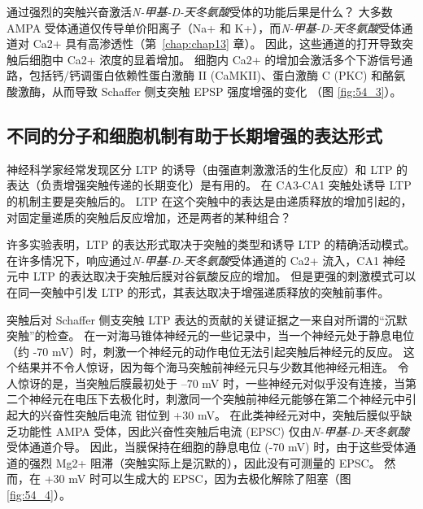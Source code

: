 通过强烈的突触兴奋激活\textit{N-甲基-D-天冬氨酸}受体的功能后果是什么？
大多数 AMPA 受体通道仅传导单价阳离子（Na+ 和 K+），而\textit{N-甲基-D-天冬氨酸}受体通道对 Ca2+ 具有高渗透性（第~\ref{chap:chap13} 章）。
因此，这些通道的打开导致突触后细胞中 Ca2+ 浓度的显着增加。
细胞内 Ca2+ 的增加会激活多个下游信号通路，包括钙/钙调蛋白依赖性蛋白激酶 II (CaMKII)、蛋白激酶 C (PKC) 和酪氨酸激酶，从而导致 Schaffer 侧支突触 EPSP 强度增强的变化 （图 \ref{fig:54_3}）。



\subsection{不同的分子和细胞机制有助于长期增强的表达形式}

神经科学家经常发现区分 LTP 的诱导（由强直刺激激活的生化反应）和 LTP 的表达（负责增强突触传递的长期变化）是有用的。
在 CA3-CA1 突触处诱导 LTP 的机制主要是突触后的。
LTP 在这个突触中的表达是由递质释放的增加引起的，对固定量递质的突触后反应增加，还是两者的某种组合？


许多实验表明，LTP 的表达形式取决于突触的类型和诱导 LTP 的精确活动模式。
在许多情况下，响应通过\textit{N-甲基-D-天冬氨酸}受体通道的 Ca2+ 流入，CA1 神经元中 LTP 的表达取决于突触后膜对谷氨酸反应的增加。
但是更强的刺激模式可以在同一突触中引发 LTP 的形式，其表达取决于增强递质释放的突触前事件。


突触后对 Schaffer 侧支突触 LTP 表达的贡献的关键证据之一来自对所谓的“沉默突触”的检查。
在一对海马锥体神经元的一些记录中，当一个神经元处于静息电位（约 -70 mV）时，刺激一个神经元的动作电位无法引起突触后神经元的反应。
这个结果并不令人惊讶，因为每个海马突触前神经元只与少数其他神经元相连。
令人惊讶的是，当突触后膜最初处于 –70 mV 时，一些神经元对似乎没有连接，当第二个神经元在电压下去极化时，刺激同一个突触前神经元能够在第二个神经元中引起大的兴奋性突触后电流 钳位到 +30 mV。
在此类神经元对中，突触后膜似乎缺乏功能性 AMPA 受体，因此兴奋性突触后电流 (EPSC) 仅由\textit{N-甲基-D-天冬氨酸}受体通道介导。
因此，当膜保持在细胞的静息电位 (-70 mV) 时，由于这些受体通道的强烈 Mg2+ 阻滞（突触实际上是沉默的），因此没有可测量的 EPSC。
然而，在 +30 mV 时可以生成大的 EPSC，因为去极化解除了阻塞（图 \ref{fig:54_4}）。


